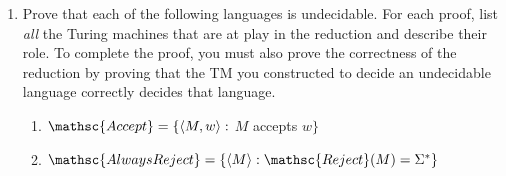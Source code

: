 \documentclass[11pt]{article}
\begin{document}
\begin{enumerate}
\item Prove that each of the following languages is undecidable. For each proof,
list \emph{all} the Turing machines that are at play in the reduction and describe their role.
To complete the proof, you must also prove the correctness of the reduction by
proving that the TM you constructed to decide an undecidable language correctly
decides that language.

\begin{enumerate}
    \item $\mathsc{Accept} = \{\langle M,w \rangle:$ $M$ accepts $w$$\}$
    \item $\mathsc{AlwaysReject} = \{\langle M \rangle: \mathsc{Reject}(M) = \Sigma^*\}$
\end{enumerate}
\end{enumerate}
\end{document}
